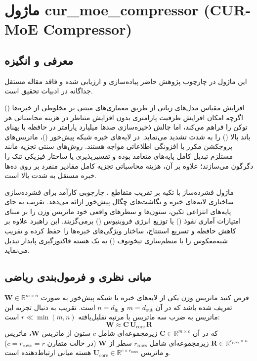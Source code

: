 \section{ماژول cur\_moe\_compressor (CUR-MoE Compressor)}
\label{sec:module_cur_moe_compressor}

\subsection{معرفی و انگیزه}
این ماژول در چارچوب پژوهش حاضر پیاده‌سازی و ارزیابی شده و فاقد مقاله مستقل جداگانه در ادبیات تحقیق است.

افزایش مقیاس مدل‌های زبانی از طریق معماری‌های مبتنی بر مخلوطی از خبره‌ها () اگرچه امکان افزایش ظرفیت پارامتری بدون افزایش متناظر در هزینه محاسباتی هر توکن را فراهم می‌کند، اما چالش ذخیره‌سازی صدها میلیارد پارامتر در حافظه با پهنای باند بالا () را به شدت تشدید می‌نماید. در لایه‌های خبره شبکه پیش‌خور ()، ماتریس‌های پروجکشن مکرر با افزونگی اطلاعاتی مواجه هستند. روش‌های سنتی تجزیه مانند  مستلزم تبدیل کامل پایه‌های متعامد بوده و تفسیرپذیری یا ساختار فیزیکی تنک را دگرگون می‌سازند؛ علاوه بر آن، هزینه محاسباتی تجزیه کامل مقادیر منفرد بر روی ده‌ها خبره مستقل به شدت بالا است.

ماژول فشرده‌ساز  با تکیه بر تقریب متقاطع ، چارچوبی کارآمد برای فشرده‌سازی ساختاری لایه‌های خبره  و نگاشت‌های چگال پیش‌خور ارائه می‌دهد. تقریب  به جای پایه‌های انتزاعی تکین، ستون‌ها و سطرهای واقعی خود ماتریس وزن را بر مبنای امتیازات آماری نفوذ () یا توزیع انرژی فروبنیوس () برمی‌گزیند. این راهبرد علاوه بر کاهش حافظه و تسریع استنتاج، ساختار ویژگی‌های خبره‌ها را حفظ کرده و تقریب شبه‌معکوس را با منظم‌سازی تیخونوف () به یک هسته فاکتورگیری پایدار تبدیل می‌نماید.

\subsection{مبانی نظری و فرمول‌بندی ریاضی}
فرض کنید ماتریس وزن یکی از لایه‌های خبره یا شبکه پیش‌خور به صورت $\mathbf{W} \in \mathbb{R}^{m \times n}$ تعریف شده باشد که در آن $m = d_{\text{out}}$ و $n = d_{\text{in}}$ است. تقریب  به دنبال تجزیه این ماتریس به ضرب سه ماتریس با مرتبه تقلیل‌یافته $r \ll \min(m, n)$ است:
\begin{equation}
\mathbf{W} \approx \mathbf{C} \, \mathbf{U}_{\text{core}} \, \mathbf{R}
\end{equation}
که در آن $\mathbf{C} \in \mathbb{R}^{m \times c}$ زیرمجموعه‌ای شامل $c$ ستون از ماتریس $\mathbf{W}$، ماتریس $\mathbf{R} \in \mathbb{R}^{r_{\text{rows}} \times n}$ زیرمجموعه‌ای شامل $r_{\text{rows}}$ سطر از $\mathbf{W}$ (در حالت متقارن $c = r_{\text{rows}} = r$) و ماتریس $\mathbf{U}_{\text{core}} \in \mathbb{R}^{c \times r_{\text{rows}}}$ هسته میانی ارتباط‌دهنده است.

